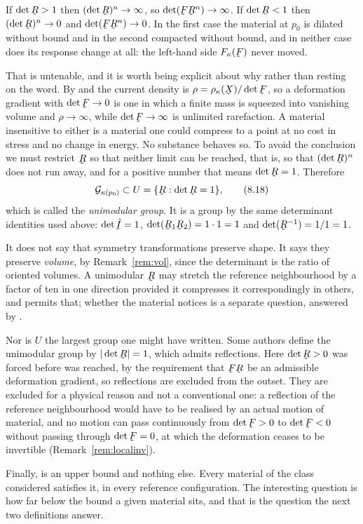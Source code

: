 If $\det\bR>1$ then $(\det\bR)^{n}\to\infty$, so
$\det(\bF\bR^{n})\to\infty$. If $\det\bR<1$ then $(\det\bR)^{n}\to0$ and
$\det(\bF\bR^{n})\to0$. In the first case the material at $p_{0}$ is
dilated without bound and in the second compacted without bound, and in
neither case does its response change at all: the left-hand side
$F_{\kappa}(\bF)$ never moved.

That is untenable, and it is worth being explicit about why rather than
resting on the word. By  and  the current density is
$\rho=\rho_{\kappa}(\bX)/\det\bF$, so a deformation gradient with
$\det\bF\to0$ is one in which a finite mass is squeezed into vanishing
volume and $\rho\to\infty$, while $\det\bF\to\infty$ is unlimited
rarefaction. A material insensitive to either is a material one could
compress to a point at no cost in stress and no change in energy. No
substance behaves so. To avoid the conclusion we must restrict $\bR$ so
that neither limit can be reached, that is, so that $(\det\bR)^{n}$ does
not run away, and for a positive number that means $\det\bR=1$.
Therefore
\begin{equation}
   \mathcal{G}_{\kappa(p_{0})}\subset U=\{\bR:\det\bR=1\},
   \tag{8.18}\label{eq:8.18}
\end{equation}
which is called the \emph{unimodular group}. It is a group by the same
determinant identities used above: $\det\hI=1$, $\det(\bR_{1}\bR_{2})=
1\cdot1=1$ and $\det(\bR^{-1})=1/1=1$.

\begin{remark}\label{rem:ch8unim}
It does not say that symmetry transformations preserve shape. It says
they preserve \emph{volume}, by Remark~\ref{rem:vol}, since the
determinant is the ratio of oriented volumes. A unimodular $\bR$ may
stretch the reference neighbourhood by a factor of ten in one direction
provided it compresses it correspondingly in others, and 
permits that; whether the material notices is a separate question,
answered by .

Nor is $U$ the largest group one might have written. Some authors define
the unimodular group by $|\det\bR|=1$, which admits reflections. Here
$\det\bR>0$ was forced before  was reached, by the requirement
that $\bF\bR$ be an admissible deformation gradient, so reflections are
excluded from the outset. They are excluded for a physical reason and
not a conventional one: a reflection of the reference neighbourhood
would have to be realised by an actual motion of material, and no motion
can pass continuously from $\det\bF>0$ to $\det\bF<0$ without passing
through $\det\bF=0$, at which the deformation ceases to be invertible
(Remark~\ref{rem:localinv}).

Finally,  is an upper bound and nothing else. Every material
of the class considered satisfies it, in every reference configuration.
The interesting question is how far below the bound a given material
sits, and that is the question the next two definitions answer.
\end{remark}

